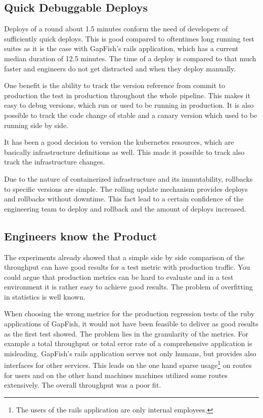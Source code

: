 \subsection{Quick Debuggable Deploys}

Deploys of a round about 1.5 minutes conform the need of developers of sufficiently quick
deploys. This is good compared to oftentimes long running test suites as it is the case with
GapFish's rails application, which has a current median duration of 12.5 minutes. The time
of a deploy is compared to that much faster and engineers do not get distracted and when
they deploy manually.

One benefit is the ability to track the version reference from commit to production the
test in production throughout the whole pipeline. This makes it easy to debug versions,
which run or used to be running in production. It is also possible to track the code
change of stable and a canary version which used to be running side by side.

It has been a good decision to version the kubernetes resources, which are basically
infrastructure definitions as well. This made it possible to track also track the
infrastructure changes.

Due to the nature of containerized infrastructure and its immutability, rollbacks to
specific versions are simple. The rolling update mechanism provides deploys and rollbacks
without downtime. This fact lead to a certain confidence of the engineering team to deploy
and rollback and the amount of deploys increased.

\subsection{Engineers know the Product}

The experiments already showed that a simple side by side comparison of the throughput can
have good results for a test metric with production traffic. You could argue that
production metrics can be hard to evaluate and in a test environment it is rather easy to
achieve good results. The problem of overfitting in statistics is well known.

When choosing the wrong metrics for the production regression tests of the ruby
applications of GapFish, it would not have been feasible to deliver as good results as the
first test showed. The problem lies in the granularity of the metrics. For example a total
throughput or total error rate of a comprehensive application is misleading. GapFish's
rails application serves not only humans, but provides also interfaces for other
services. This leads on the one hand sparse usage\footnote{The users of the rails
  application are only internal employees.} on routes for users and on the other hand
machines machines utilized some routes extensively. The overall throughput was a poor fit.


